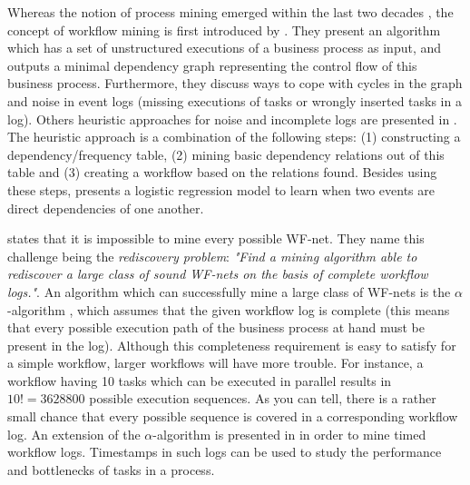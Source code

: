 \documentclass[a4paper,11pt]{article}
\begin{document}
Whereas the notion of process mining emerged within the last two decades \cite{VanderAalst2003}, the concept of workflow mining is first introduced by \cite{Agrawal1998}. They present an algorithm which has a set of unstructured executions of a business process as input, and outputs a minimal dependency graph representing the control flow of this business process. Furthermore, they discuss ways to cope with cycles in the graph and noise in event logs (missing executions of tasks or wrongly inserted tasks in a log). Others heuristic approaches for noise and incomplete logs are presented in \cite{Maruster2002,Weijters2001,Weijters}. The heuristic approach \cite{Weijters2001,Weijters} is a combination of the following steps: (1) constructing a dependency/frequency table, (2) mining basic dependency relations out of this table and (3) creating a workflow based on the relations found. Besides using these steps, \cite{Maruster2002} presents a logistic regression model to learn when two events are direct dependencies of one another. 


\cite{VanDerAalst2002} states that it is impossible to mine every possible WF-net. They name this challenge being the \textit{rediscovery problem}: \textit{"Find a mining algorithm able to rediscover a large class of sound WF-nets on the basis of complete workflow logs."}\cite{VanDerAalst2002}. An algorithm which can successfully mine a large class of WF-nets is the $\alpha$-algorithm \cite{VanderAalst2003,VanDerAalst2002,VanderAalst2002TimedLogs}, which assumes that the given workflow log is complete (this means that every possible execution path of the business process at hand must be present in the log). Although this completeness requirement is easy to satisfy for a simple workflow, larger workflows will have more trouble. For instance, a workflow having 10 tasks which can be executed in parallel results in $10!=3628800$ possible execution sequences. As you can tell, there is a rather small chance that every possible sequence is covered in a corresponding workflow log. An extension of the $\alpha$-algorithm is presented in \cite{VanderAalst2002TimedLogs} in order to mine timed workflow logs. Timestamps in such logs can be used to study the performance and bottlenecks of tasks in a process. 






\end{document}
